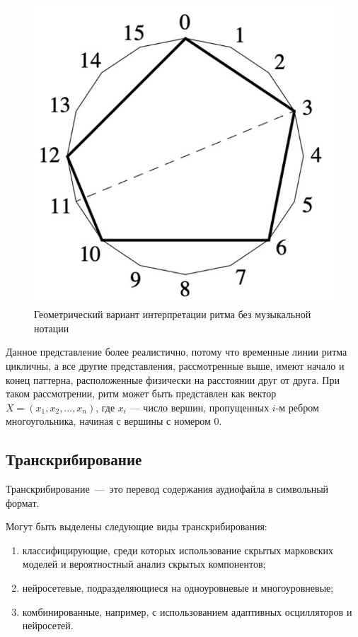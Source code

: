 \begin{figure}[h!]
    \centering
    \includegraphics[scale=0.4]{img/pol.pdf}
    \caption{Геометрический вариант интерпретации ритма без музыкальной нотации \cite{bib3}}
    \label{img:pol}
\end{figure}

Данное представление более реалистично, потому что временные линии ритма цикличны, а все другие представления, рассмотренные выше, имеют начало и конец паттерна, расположенные физически на расстоянии друг от друга. При таком рассмотрении, ритм может быть представлен как вектор $X = (x_1, x_2, ..., x_n)$, где $x_i$ — число вершин, пропущенных $i$-м ребром многоугольника, начиная с вершины с номером 0.

\subsection{Транскрибирование}

Транскрибирование~---~это перевод содержания аудиофайла в символьный формат.

Могут быть выделены следующие виды транскрибирования:
\begin{enumerate}
	\item классифицирующие, среди которых использование скрытых марковских моделей и вероятностный анализ скрытых компонентов;
	\item нейросетевые, подразделяющиеся на одноуровневые и многоуровневые;
	\item комбинированные, например, с использованием адаптивных осцилляторов и нейросетей.
\end{enumerate}

